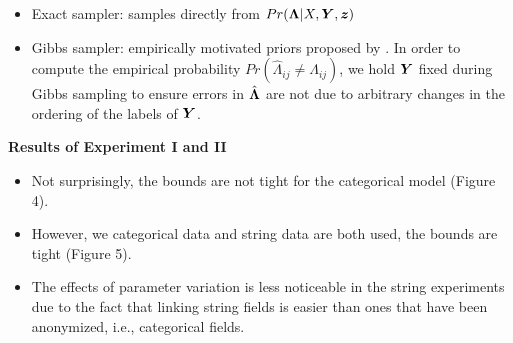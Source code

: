 \documentclass[portrait,a0,final]{a0poster}
\newenvironment{poster}{
  \begin{center}
  \begin{minipage}[c]{0.98\textwidth}
}{
  \end{minipage}
  \end{center}
}
\newcommand{\pbox}[4]{
\psshadowbox[#3]{
\begin{minipage}[t][#2][t]{#1}
#4
\end{minipage}
}}
\begin{document}
\begin{poster}
\begin{multicols}{3}
\vspace{.25cm}\begin{center}\pbox{0.8\columnwidth}{}{linewidth=2mm,framearc=0.1,linecolor=lightblue,
fillstyle=gradient,gradangle=0,gradbegin=white,gradend=whiteblue,gradmidpoint=1.0,framesep=1em}
{\begin{center}{\large \bf Comparisons}\end{center}}\end{center}\vspace{.3cm}
\vspace*{1em}

\begin{itemize}
\item Exact sampler: samples directly from $Pr(\boldsymbol{\Lambda} | X, \boldsymbol{Y}, \boldsymbol{z})$
\item Gibbs sampler: empirically motivated priors proposed by \cite{steorts15entity}. 
In order to compute the empirical probability $Pr( \hat{\Lambda}_{ij} \ne \Lambda_{ij})$, we hold $\boldsymbol{Y}$ fixed during Gibbs sampling to ensure errors in $\hat {\boldsymbol{\Lambda}}$ are not due to arbitrary changes in the ordering of the labels of $\boldsymbol{Y}$. \end{itemize}
%

\textbf{Results of Experiment I and II}
\begin{itemize}
\item Not surprisingly, the bounds are not tight for the categorical model (Figure 4). 

\item However, we categorical data and string data are both used, the bounds are tight (Figure 5). 

\item The effects of parameter variation is less noticeable in the string experiments due to the fact that linking string fields is easier than ones that have been anonymized, i.e., categorical fields. 

\end{itemize}


\end{multicols}
\end{poster}
\end{document}
